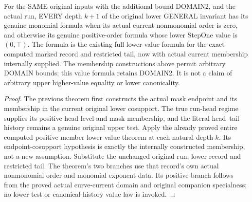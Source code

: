 \begin{theorem}
\label{hir:original-positive-member-run-unconditional-lower-values}
\leanok
For the SAME original inputs with the additional bound DOMAIN2, and
the actual run, EVERY depth $k+1$ of the
original lower GENERAL invariant has its genuine monomial formula when
its actual current nonmonomial order is zero, and otherwise its genuine
positive-order formula whose lower StepOne value is $(0,\top)$.
The formula is the existing full lower-value formula for the exact
computed marked record and restricted tail, now with actual current
membership internally supplied. The membership constructions above
permit arbitrary DOMAIN bounds; this value formula retains DOMAIN2.
It is not a claim of arbitrary upper
higher-value equality or lower canonicality.
\end{theorem}
\begin{proof}
The previous theorem first constructs the actual mask endpoint and its
membership in the current original lower cosupport. The true run-head
regime supplies its positive head level and mask membership, and the
literal head--tail history remains a genuine original upper test.
Apply the already proved entire computed-positive-member lower-value
theorem at each natural depth $k$. Its endpoint-cosupport hypothesis is
exactly the internally constructed membership, not a new assumption.
Substitute the unchanged original run, lower record and restricted tail.
The theorem's two branches use that record's own actual nonmonomial
order and monomial exponent data. Its positive branch follows from the
proved actual curve-current domain and original companion specialness;
no lower test or canonical-history value law is invoked.
\end{proof}
